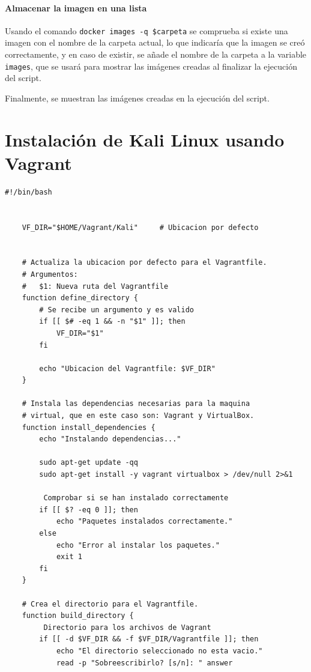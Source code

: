 \begin{appendices}
            \paragraph{Almacenar la imagen en una lista}

                Usando el comando \verb|docker images -q $carpeta| se comprueba si existe una imagen con el nombre de la carpeta actual, lo que indicaría que la imagen se creó correctamente, y en caso de existir, se añade el nombre de la carpeta a la variable \texttt{images}, que se usará para mostrar las imágenes creadas al finalizar la ejecución del script.

            Finalmente, se muestran las imágenes creadas en la ejecución del script.

            \newpage


        \section{Instalación de Kali Linux usando Vagrant}

            \begin{lstlisting}[style=bash_style, basicstyle=\ttfamily\scriptsize]
    #!/bin/bash


    VF_DIR="$HOME/Vagrant/Kali"     # Ubicacion por defecto
    
    
    # Actualiza la ubicacion por defecto para el Vagrantfile.
    # Argumentos:
    #   $1: Nueva ruta del Vagrantfile
    function define_directory {
        # Se recibe un argumento y es valido
        if [[ $# -eq 1 && -n "$1" ]]; then
            VF_DIR="$1"
        fi
    
        echo "Ubicacion del Vagrantfile: $VF_DIR"
    }
    
    # Instala las dependencias necesarias para la maquina
    # virtual, que en este caso son: Vagrant y VirtualBox.
    function install_dependencies {
        echo "Instalando dependencias..."
    
        sudo apt-get update -qq
        sudo apt-get install -y vagrant virtualbox > /dev/null 2>&1
    
         Comprobar si se han instalado correctamente
        if [[ $? -eq 0 ]]; then
            echo "Paquetes instalados correctamente."
        else
            echo "Error al instalar los paquetes."
            exit 1
        fi
    }
    
    # Crea el directorio para el Vagrantfile.
    function build_directory {
         Directorio para los archivos de Vagrant
        if [[ -d $VF_DIR && -f $VF_DIR/Vagrantfile ]]; then
            echo "El directorio seleccionado no esta vacio."
            read -p "Sobreescribirlo? [s/n]: " answer
    

\end{lstlisting}
\end{appendices}

